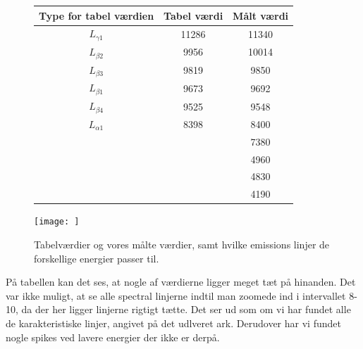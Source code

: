 \documentclass[a4paper,twoside]{article}
\begin{document}
\begin{figure}[H]
 
\begin{center}
\begin{tabular}{||c c c ||} 
 \hline
 Type for tabel værdien & Tabel værdi & Målt værdi \\ [0.5ex] 
 \hline\hline
 $L_{\gamma1}$ & 11286 & 11340  \\ 
 \hline
  $L_{\beta2}$ & 9956 & 10014 \\ 
 \hline
$L_{\beta3}$ & 9819  & 9850  \\
 \hline
 $L_{\beta1}$ & 9673 & 9692 \\ [1ex] 
 \hline
 $L_{\beta4}$ & 9525 & 9548 \\
 \hline
 $L_{\alpha1}$ & 8398 & 8400 \\ [1ex] 
  \hline
 & & 7380 \\ [1ex] 
  \hline
 & & 4960 \\ [1ex]  
 \hline
  & & 4830 \\ [1ex] 
 \hline
  & & 4190\\ [ex] 
 \hline
\end{tabular}
\end{center}
   \centering
    \texttt{[image: ]}
    \caption{Tabelværdier og vores målte værdier, samt hvilke emissions linjer de forskellige energier passer til.\cite{X-ray absorption and emmission energies of elements}}
    \label{fig:my_label}
\end{figure}
På tabellen kan det ses, at nogle af værdierne ligger meget tæt på hinanden. Det var ikke muligt, at se alle spectral linjerne indtil man zoomede ind i intervallet 8-10, da der her ligger linjerne rigtigt tætte. Det ser ud som om vi har fundet alle de karakteristiske linjer, angivet på det udlveret ark. Derudover har vi fundet nogle spikes ved lavere energier der ikke er derpå.
\end{document}
